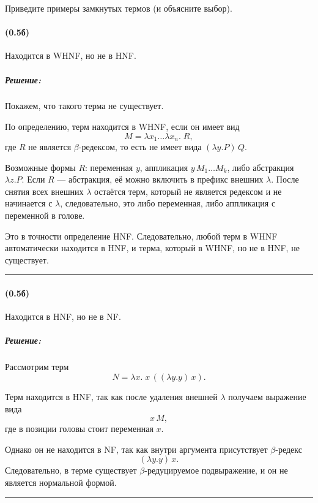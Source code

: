 \documentclass{article}
\newenvironment{proof}{\subparagraph{\hspace{-1em}Решение:\newline}}{\par\noindent\rule{\textwidth}{0.4pt}}
\begin{document}
    \subsubsection{}

    Приведите примеры замкнутых термов (и объясните выбор).

    \paragraph{(0.5б)}

    Находится в WHNF, но не в HNF.

    \begin{proof}

        Покажем, что такого терма не существует.

        По определению, терм находится в WHNF, если он имеет вид
        \[
            M = \lambda x_1 \dots \lambda x_n.\; R,
        \]
        где $R$ не является $\beta$-редексом, то есть не имеет вида $(\lambda y.P)\,Q$.

        Возможные формы $R$: переменная $y$, аппликация $y\,M_1 \dots M_k$, либо абстракция $\lambda z.P$. Если $R$ — абстракция, её можно включить в префикс внешних $\lambda$. После снятия всех внешних $\lambda$ остаётся терм, который не является редексом и не начинается с $\lambda$, следовательно, это либо переменная, либо аппликация с переменной в голове.

        Это в точности определение HNF. Следовательно, любой терм в WHNF автоматически находится в HNF, и терма, который в WHNF, но не в HNF, не существует.
    \end{proof}

    \paragraph{(0.5б)}

    Находится в HNF, но не в NF.

    \begin{proof}
        Рассмотрим терм
        \[
            N = \lambda x.\; x\,((\lambda y. y)\,x).
        \]

        Терм находится в HNF, так как после удаления внешней
        \(\lambda\) получаем выражение вида
        \[
            x\,M,
        \]
        где в позиции головы стоит переменная \(x\).

        Однако он не находится в NF, так как внутри аргумента
        присутствует \(\beta\)-редекс
        \[
            (\lambda y. y)\,x.
        \]
        Следовательно, в терме существует \(\beta\)-редуцируемое подвыражение,
        и он не является нормальной формой.
    \end{proof}
\end{document}
